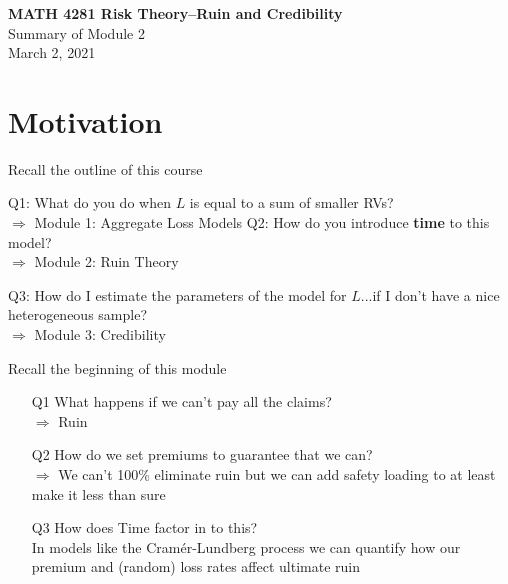 \documentclass[11pt]{beamer}
\begin{document}
\begin{frame}
  \frametitle{}
  \begin{center}
    \textbf{\large MATH 4281 Risk Theory--Ruin and Credibility}\\
    \vspace{1cm}
    {\large  Summary of Module 2} \\
    \vspace{1cm}
    {\large  March 2, 2021}
    \end{center}
    \vspace{1cm}
\end{frame}
\begin{frame}
\tableofcontents
\end{frame}
\section{Motivation}
\begin{frame}{Recall the outline of this course}

Q1: What do you do when $L$ is equal to a sum of smaller RVs? \\
\color{red}$\Rightarrow$  Module 1: Aggregate Loss Models
\vfill
\color{black}Q2: How do you introduce \textbf{time} to this model? \\
\color{red}$\Rightarrow$  Module 2: Ruin Theory
\vfill


\color{black} Q3: How do I estimate the parameters of the model for $L$...if I don't have a nice heterogeneous sample? \\
\color{red}$\Rightarrow$  Module 3: Credibility 

\end{frame}

\begin{frame}{Recall the beginning of this module} 

\begin{itemize}

\item[Q1] What happens if we can't pay all the claims?\\
\alert{$\Rightarrow$ Ruin}
\vfill

\item[Q2] How do we set premiums to guarantee that we can? \\
\alert{$\Rightarrow$ We can't 100\% eliminate ruin but we can add safety loading to at least make it less than sure}


\vfill

\item[Q3] How does \alert{Time} factor in to this?\\
\alert{ In models like the Cram\'er-Lundberg process we can quantify how our premium and (random) loss rates affect ultimate ruin}

\end{itemize}

\end{frame}
\end{document}
